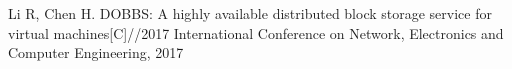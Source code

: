 
\begin{publications}{99}
    \item\textsc Li R, Chen H. DOBBS: A highly available distributed block storage service for virtual machines[C]//2017 International Conference on Network, Electronics and Computer Engineering, 2017
\end{publications}
